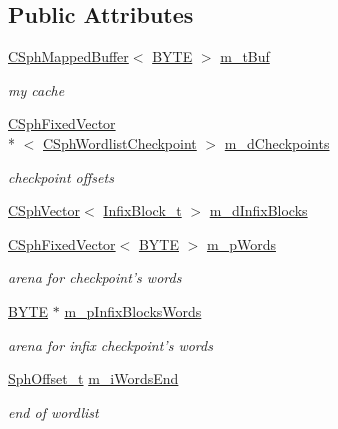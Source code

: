 \subsection*{Public Attributes}
\begin{DoxyCompactItemize}
\item 
\hyperlink{classCSphMappedBuffer}{C\-Sph\-Mapped\-Buffer}$<$ \hyperlink{sphinxstd_8h_a4ae1dab0fb4b072a66584546209e7d58}{B\-Y\-T\-E} $>$ \hyperlink{classCWordlist_aa08038abe1363d3da8f707084329ecd4}{m\-\_\-t\-Buf}
\begin{DoxyCompactList}\small\item\em my cache \end{DoxyCompactList}\item 
\hyperlink{classCSphFixedVector}{C\-Sph\-Fixed\-Vector}\\*
$<$ \hyperlink{structCSphWordlistCheckpoint}{C\-Sph\-Wordlist\-Checkpoint} $>$ \hyperlink{classCWordlist_a2f52708e559f3a2e5318dec6289c403e}{m\-\_\-d\-Checkpoints}
\begin{DoxyCompactList}\small\item\em checkpoint offsets \end{DoxyCompactList}\item 
\hyperlink{classCSphVector}{C\-Sph\-Vector}$<$ \hyperlink{structInfixBlock__t}{Infix\-Block\-\_\-t} $>$ \hyperlink{classCWordlist_a86a597d2bc66b2e016f4e978f5be458b}{m\-\_\-d\-Infix\-Blocks}
\item 
\hyperlink{classCSphFixedVector}{C\-Sph\-Fixed\-Vector}$<$ \hyperlink{sphinxstd_8h_a4ae1dab0fb4b072a66584546209e7d58}{B\-Y\-T\-E} $>$ \hyperlink{classCWordlist_a6079074dc4ddc2b9fd8bd380fe0b811e}{m\-\_\-p\-Words}
\begin{DoxyCompactList}\small\item\em arena for checkpoint's words \end{DoxyCompactList}\item 
\hyperlink{sphinxstd_8h_a4ae1dab0fb4b072a66584546209e7d58}{B\-Y\-T\-E} $\ast$ \hyperlink{classCWordlist_ac857c9efec46e02df54da78b8215491d}{m\-\_\-p\-Infix\-Blocks\-Words}
\begin{DoxyCompactList}\small\item\em arena for infix checkpoint's words \end{DoxyCompactList}\item 
\hyperlink{sphinx_8h_a0fb3b64afebef33c61367714754eaa90}{Sph\-Offset\-\_\-t} \hyperlink{classCWordlist_a3b018fb3c0a440481a2a7d1f7bec851d}{m\-\_\-i\-Words\-End}
\begin{DoxyCompactList}\small\item\em end of wordlist \end{DoxyCompactList}\item 

\end{DoxyCompactItemize}
